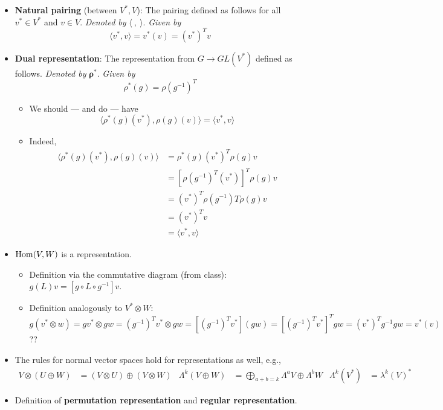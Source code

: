 \documentclass[../notes.tex]{subfiles}
\begin{document}
\begin{itemize}
    \item \textbf{Natural pairing} (between $V^*,V$): The pairing defined as follows for all $v^*\in V^*$ and $v\in V$. \emph{Denoted by} $\bm{\langle\ ,\ \rangle}$. \emph{Given by}
    \begin{equation*}
        \langle v^*,v \rangle = v^*(v) = (v^*)^Tv
    \end{equation*}
    \item \textbf{Dual representation}: The representation from $G\to GL(V^*)$ defined as follows. \emph{Denoted by} $\bm{\rho^*}$. \emph{Given by}
    \begin{equation*}
        \rho^*(g) = \rho(g^{-1})^T
    \end{equation*}
    \begin{itemize}
        \item We should --- and do --- have
        \begin{equation*}
            \langle \rho^*(g)(v^*),\rho(g)(v) \rangle = \langle v^*,v \rangle
        \end{equation*}
        \item Indeed,
        \begin{align*}
            \langle \rho^*(g)(v^*),\rho(g)(v) \rangle &= \rho^*(g)(v^*)^T\rho(g)v\\
            &= [\rho(g^{-1})^T(v^*)]^T\rho(g)v\\
            &= (v^*)^T\rho(g^{-1})T\rho(g)v\\
            &= (v^*)^Tv\\
            &= \langle v^*,v \rangle
        \end{align*}
    \end{itemize}
    \item $\operatorname{Hom}(V,W)$ is a representation.
    \begin{itemize}
        \item Definition via the commutative diagram (from class): $g(L)v=[g\circ L\circ g^{-1}]v$.
        \item Definition analogously to $V^*\otimes W$: $g(v^*\otimes w)=gv^*\otimes gw=(g^{-1})^Tv^*\otimes gw=[(g^{-1})^Tv^*](gw)=[(g^{-1})^Tv^*]^Tgw=(v^*)^Tg^{-1}gw=v^*(v)$??
    \end{itemize}
    \item The rules for normal vector spaces hold for representations as well, e.g.,
    \begin{align*}
        V\otimes(U\oplus W) &= (V\otimes U)\oplus(V\otimes W)&
        \Lambda^k(V\oplus W) &= \bigoplus_{a+b=k}\Lambda^aV\oplus\Lambda^bW&
        \Lambda^k(V^*) &= \lambda^k(V)^*
    \end{align*}
    \item Definition of \textbf{permutation representation} and \textbf{regular representation}.
\end{itemize}
\end{document}
